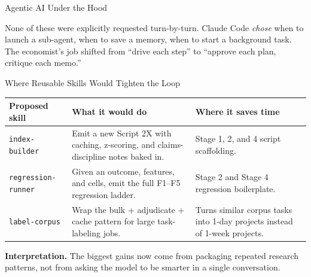 \documentclass[10pt,english,aspectratio=169]{beamer}
\begin{document}
\begin{frame}{Agentic AI Under the Hood}
\vspace{0.1cm}
\begin{tcolorbox}[colback=blue!3,colframe=RedTitle!60]\scriptsize
None of these were explicitly requested turn-by-turn. Claude Code \emph{chose} when to launch a sub-agent, when to save a memory, when to start a background task. The economist's job shifted from ``drive each step'' to ``approve each plan, critique each memo.''
\end{tcolorbox}
\end{frame}

\begin{frame}{Where Reusable Skills Would Tighten the Loop}
\scriptsize
\begin{tabular}{p{3.0cm}p{4.4cm}p{4.6cm}}
\toprule
\textbf{Proposed skill} & \textbf{What it would do} & \textbf{Where it saves time} \\
\midrule
\texttt{index-builder} & Emit a new Script 2X with caching, z-scoring, and claims-discipline notes baked in. & Stage 1, 2, and 4 script scaffolding. \\
\texttt{regression-runner} & Given an outcome, features, and cells, emit the full F1--F5 regression ladder. & Stage 2 and Stage 4 regression boilerplate. \\
\texttt{label-corpus} & Wrap the bulk + adjudicate + cache pattern for large task-labeling jobs. & Turns similar corpus tasks into 1-day projects instead of 1-week projects. \\
\bottomrule
\end{tabular}

\vspace{0.16cm}
\begin{tcolorbox}[colback=blue!3,colframe=RedTitle!60]\scriptsize
\textbf{Interpretation.} The biggest gains now come from packaging repeated research patterns, not from asking the model to be smarter in a single conversation.
\end{tcolorbox}
\end{frame}
\end{document}
